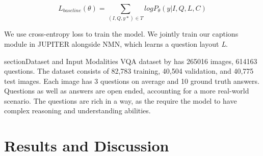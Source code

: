 \begin{itemize}
\begin{equation}
    L_{baseline}(\theta) = \sum_{(I, Q, y*) \in T} logP_\theta(y | I, Q, L, C) 
\end{equation}

\end{itemize}
We use cross-entropy loss to train the model. We jointly train our captions module in JUPITER alongside NMN, which learns a question layout \textit{L}. 

section{Dataset and Input Modalities}
VQA dataset by \cite{AntolALMBZP15} has 265016 images, 614163
questions.  The dataset consists of  82,783 training, 40,504 validation, and 40,775 test images. Each image has 3 questions on average and 10 ground truth answers. Questions as well as answers are open ended, accounting for a more real-world scenario. The questions are rich in a way, as the require the model to have complex reasoning and understanding abilities.


\section{Results and Discussion}

